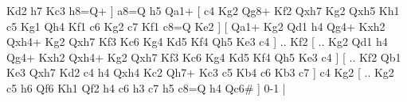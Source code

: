 Kd2  h7 Kc3  h8=Q+   ]  a8=Q   h5    Qa1+ [  c4 Kg2  Qg8+ Kf2  Qxh7 Kg2  Qxh5 Kh1  c5 Kg1  Qh4 Kf1  c6 Kg2  c7 Kf1  c8=Q Ke2   ]  [  Qa1+ Kg2  Qd1 h4  Qg4+ Kxh2  Qxh4+ Kg2  Qxh7 Kf3  Kc6 Kg4  Kd5 Kf4  Qh5 Ke3  c4   ] .. Kf2 [ .. Kg2  Qd1 h4  Qg4+ Kxh2  Qxh4+ Kg2  Qxh7 Kf3  Kc6 Kg4  Kd5 Kf4  Qh5 Ke3  c4   ]  [ .. Kf2  Qb1 Ke3  Qxh7 Kd2  c4 h4  Qxh4 Kc2  Qh7+ Kc3  c5 Kb4  c6 Kb3  c7   ]  c4   Kg2    [ .. Kg2  c5 h6  Qf6 Kh1  Qf2 h4  c6 h3  c7 h5  c8=Q h4  Qc6#   ] 0-1  |
